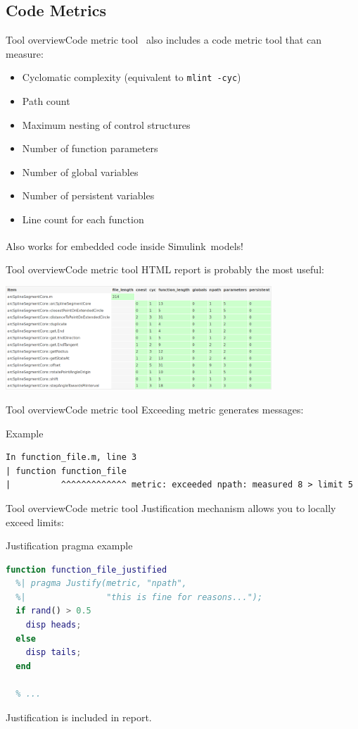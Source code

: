 \documentclass{beamer}
\newcommand{\mh}[0]{{\sc\structure{Miss\_Hit}}}
\newcommand{\simulink}[0]{Simulink\textsuperscript{\tiny\textregistered}}
\begin{document}
\subsection{Code Metrics}
\begin{frame}{Tool overview}{Code metric tool}
  \mh~also includes a code metric tool that can measure:
  \begin{itemize}
  \item Cyclomatic complexity (equivalent to {\tt mlint -cyc})
  \item Path count
  \item Maximum nesting of control structures
  \item Number of function parameters
  \item Number of global variables
  \item Number of persistent variables
  \item Line count for each function
  \end{itemize}
  \pause
  Also works for embedded code inside \simulink\ models!
\end{frame}

\begin{frame}{Tool overview}{Code metric tool}
  HTML report is probably the most useful:
  \begin{center}
    \includegraphics[width=10cm]{metrics.png}
  \end{center}
\end{frame}

\begin{frame}[fragile]{Tool overview}{Code metric tool}
  Exceeding metric generates messages:
  \begin{block}{Example}
    \scriptsize
\begin{verbatim}
In function_file.m, line 3
| function function_file
|          ^^^^^^^^^^^^^ metric: exceeded npath: measured 8 > limit 5
\end{verbatim}
  \end{block}
\end{frame}

\begin{frame}[fragile]{Tool overview}{Code metric tool}
  Justification mechanism allows you to locally exceed limits:
  \begin{block}{Justification pragma example}
\begin{lstlisting}[language=MATLAB]
function function_file_justified
  %| pragma Justify(metric, "npath",
  %|                "this is fine for reasons...");
  if rand() > 0.5
    disp heads;
  else
    disp tails;
  end

  % ...
\end{lstlisting}
  \end{block}
  \pause
  Justification is included in report.
\end{frame}
\end{document}
